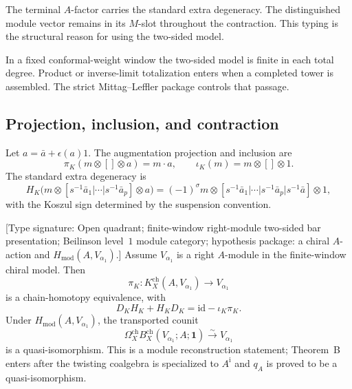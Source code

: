 \begin{remark}
\label{rem:tbsp-two-sided-vs-bicomplex}
The terminal \(A\)-factor carries the standard extra degeneracy.
The distinguished module vector remains in its \(M\)-slot throughout
the contraction.  This typing is the structural reason for using the
two-sided model.
\end{remark}

\begin{remark}
\label{rem:tbsp-coderived-total}
In a fixed conformal-weight window the two-sided model is finite in
each total degree.  Product or inverse-limit totalization enters when
a completed tower is assembled.  The strict Mittag--Leffler
package controls that passage.
\end{remark}

\subsection{Projection, inclusion, and contraction}
\label{subsec:tbsp-homotopy-valpha1}

\begin{construction}
\label{cons:tbsp-projection-homotopy}
Let \(a=\bar a+\epsilon(a)1\).  The augmentation projection and
inclusion are
\[
 \pi_K(m\otimes[]\otimes a)=m\cdot a,
 \qquad
 \iota_K(m)=m\otimes[]\otimes1.
\]
The standard extra degeneracy is
\begin{equation}\label{eq:tbsp-homotopy-formula}
 H_K\bigl(
 m\otimes[s^{-1}\bar a_1|\cdots|s^{-1}\bar a_p]\otimes a
 \bigr)
 =
 (-1)^\sigma
 m\otimes[s^{-1}\bar a_1|\cdots|s^{-1}\bar a_p|
 s^{-1}\bar a]\otimes1,
\end{equation}
with the Koszul sign determined by the suspension convention.
\end{construction}

\begin{theorem}
\label{thm:tbsp-module-theorem-B-valpha1}
\textup{[Type signature: Open quadrant; finite-window right-module
two-sided bar presentation; Beilinson level~\(1\) module category;
hypothesis package: a chiral \(A\)-action and
\(H_{\mathrm{mod}}(A,V_{\alpha_1})\).]}
Assume \(V_{\alpha_1}\) is a right \(A\)-module in the finite-window
chiral model.  Then
\[
 \pi_K\colon K_X^{\mathrm{ch}}(A,V_{\alpha_1})
 \longrightarrow V_{\alpha_1}
\]
is a chain-homotopy equivalence, with
\begin{equation}\label{eq:tbsp-homotopy-identity}
 D_KH_K+H_KD_K
 =
 \mathrm{id}-\iota_K\pi_K .
\end{equation}
Under \(H_{\mathrm{mod}}(A,V_{\alpha_1})\), the transported counit
\begin{equation}\label{eq:tbsp-module-counit-chain}
 \Omega_X^{\mathrm{ch}}
 B_X^{\mathrm{ch}}(V_{\alpha_1};A;\mathbf1)
 \xrightarrow{\sim}V_{\alpha_1}
\end{equation}
is a quasi-isomorphism.  This is a module reconstruction statement;
Theorem~B enters after the twisting coalgebra is specialized to
\(A^{\mathrm i}\) and \(q_A\) is proved to be a quasi-isomorphism.
\end{theorem}

